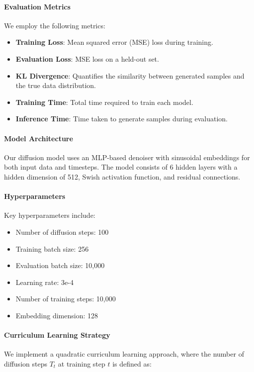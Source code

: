 \documentclass{article} %
\begin{document}
\paragraph{Evaluation Metrics} We employ the following metrics:
\begin{itemize}
    \item \textbf{Training Loss}: Mean squared error (MSE) loss during training.
    \item \textbf{Evaluation Loss}: MSE loss on a held-out set.
    \item \textbf{KL Divergence}: Quantifies the similarity between generated samples and the true data distribution.
    \item \textbf{Training Time}: Total time required to train each model.
    \item \textbf{Inference Time}: Time taken to generate samples during evaluation.
\end{itemize}

\paragraph{Model Architecture} Our diffusion model uses an MLP-based denoiser with sinusoidal embeddings for both input data and timesteps. The model consists of 6 hidden layers with a hidden dimension of 512, Swish activation function, and residual connections.

\paragraph{Hyperparameters} Key hyperparameters include:
\begin{itemize}
    \item Number of diffusion steps: 100
    \item Training batch size: 256
    \item Evaluation batch size: 10,000
    \item Learning rate: 3e-4
    \item Number of training steps: 10,000
    \item Embedding dimension: 128
\end{itemize}

\paragraph{Curriculum Learning Strategy} We implement a quadratic curriculum learning approach, where the number of diffusion steps $T_t$ at training step $t$ is defined as:
\end{document}
